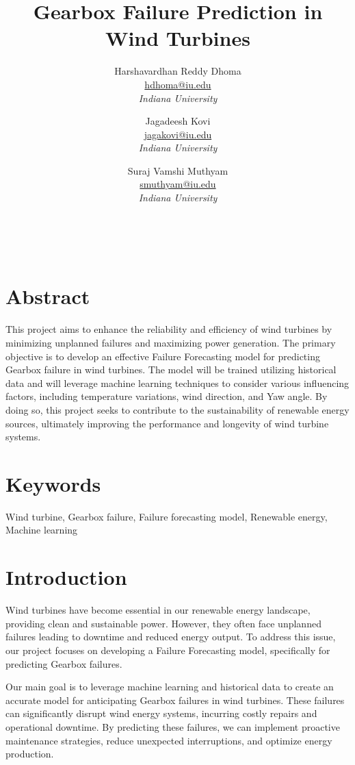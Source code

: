 \documentclass[11pt,a4paper]{article}
\title{\textbf{Gearbox Failure Prediction in Wind Turbines}}
\author{
    Harshavardhan Reddy Dhoma \\
    \href{mailto:hdhoma@iu.edu}{hdhoma@iu.edu} \\
    \textit{Indiana University} \\
    \and
    Jagadeesh Kovi \\
    \href{mailto:jagakovi@iu.edu}{jagakovi@iu.edu} \\
    \textit{Indiana University}
    \and
    Suraj Vamshi Muthyam \\
    \href{mailto:smuthyam@iu.edu}{smuthyam@iu.edu} \\
    \textit{Indiana University}
}
\date{}
\begin{document}
\maketitle

{ \\} %
\vspace{1cm} %

\section*{Abstract}
This project aims to enhance the reliability and efficiency of wind turbines by minimizing unplanned failures and maximizing power generation. The primary objective is to develop an effective Failure Forecasting model for predicting Gearbox failure in wind turbines. The model will be trained utilizing historical data and will leverage machine learning techniques to consider various influencing factors, including temperature variations, wind direction, and Yaw angle. By doing so, this project seeks to contribute to the sustainability of renewable energy sources, ultimately improving the performance and longevity of wind turbine systems.

\section*{Keywords}
Wind turbine, Gearbox failure, Failure forecasting model, Renewable energy, Machine learning

\section{Introduction}
Wind turbines have become essential in our renewable energy landscape, providing clean and sustainable power. However, they often face unplanned failures leading to downtime and reduced energy output. To address this issue, our project focuses on developing a Failure Forecasting model, specifically for predicting Gearbox failures.

Our main goal is to leverage machine learning and historical data to create an accurate model for anticipating Gearbox failures in wind turbines. These failures can significantly disrupt wind energy systems, incurring costly repairs and operational downtime. By predicting these failures, we can implement proactive maintenance strategies, reduce unexpected interruptions, and optimize energy production.
\end{document}
